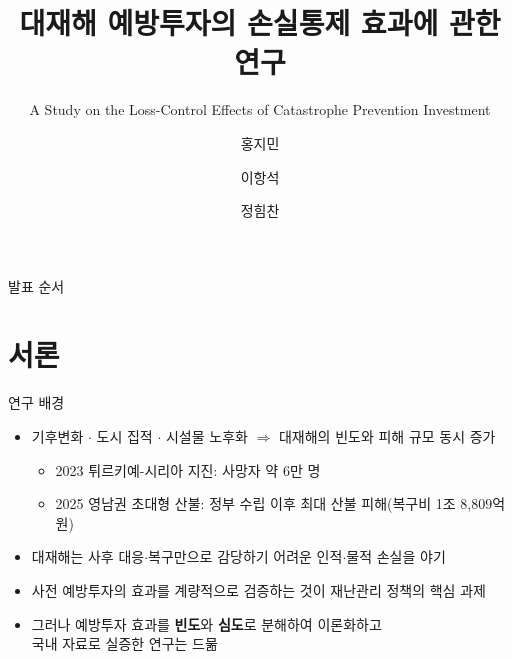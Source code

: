 \documentclass[aspectratio=169,10pt]{beamer}
\title{대재해 예방투자의 손실통제 효과에 관한 연구}
\subtitle{A Study on the Loss-Control Effects of Catastrophe Prevention Investment}
\author{홍지민 \and 이항석 \and 정힘찬}
\date{}
\begin{document}
\maketitle

\begin{frame}{발표 순서}
  \tableofcontents
\end{frame}

\section{서론}

\begin{frame}{연구 배경}
  \begin{itemize}
    \item 기후변화 $\cdot$ 도시 집적 $\cdot$ 시설물 노후화 $\Rightarrow$ 대재해의 \alert{빈도와 피해 규모} 동시 증가
    \begin{itemize}
      \item 2023 튀르키예-시리아 지진: 사망자 약 6만 명
      \item 2025 영남권 초대형 산불: 정부 수립 이후 최대 산불 피해(복구비 1조 8,809억 원)
    \end{itemize}
    \item 대재해는 사후 대응$\cdot$복구만으로 감당하기 어려운 인적$\cdot$물적 손실을 야기
    \item[$\Rightarrow$] 사전 \alert{예방투자의 효과를 계량적으로 검증}하는 것이 재난관리 정책의 핵심 과제
    \item 그러나 예방투자 효과를 \textbf{빈도}와 \textbf{심도}로 분해하여 이론화하고\\
          국내 자료로 실증한 연구는 드묾
  \end{itemize}
\end{frame}
\end{document}
